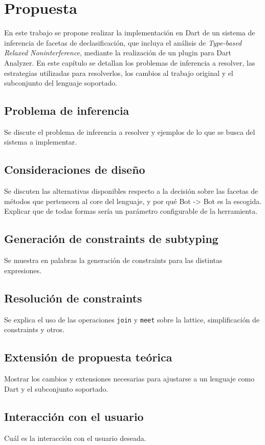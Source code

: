 \chapter{Propuesta}

En este trabajo se propone realizar la implementación en Dart de un sistema de inferencia de facetas de declasificación, que incluya el análisis de \textit{Type-based Relaxed Noninterference}, mediante la realización de un plugin para Dart Analyzer. En este capítulo se detallan los problemas de inferencia a resolver, las estrategias utilizadas para resolverlos, los cambios al trabajo original y el subconjunto del lenguaje soportado.

\section{Problema de inferencia}
Se discute el problema de inferencia a resolver y ejemplos de lo que se busca del sistema a implementar.

\section{Consideraciones de diseño}
Se discuten las alternativas disponibles respecto a la decisión sobre las facetas de métodos que pertenecen al core del lenguaje, y por qué Bot -> Bot es la escogida. Explicar que de todas formas sería un parámetro configurable de la herramienta.

\section{Generación de constraints de subtyping}
Se muestra en palabras la generación de constraints para las distintas expresiones.

\section{Resolución de constraints}
Se explica el uso de las operaciones \texttt{join} y \texttt{meet} sobre la lattice, simplificación de constraints y otros.

\section{Extensión de propuesta teórica}
Mostrar los cambios y extensiones necesarias para ajustarse a un lenguaje como Dart y el subconjunto soportado.

\section{Interacción con el usuario}
Cuál es la interacción con el usuario deseada.
